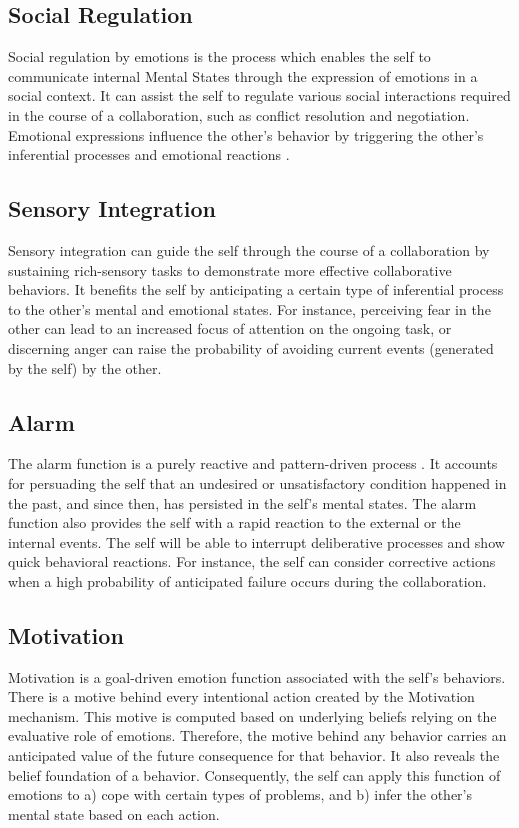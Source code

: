 \documentclass[12pt]{report}
\begin{document}
\subsection{Social Regulation} Social regulation by emotions is the process
which enables the self to communicate internal Mental States through the
expression of emotions in a social context. It can assist the self to regulate
various social interactions required in the course of a collaboration, such as
conflict resolution and negotiation. Emotional expressions influence the other's
behavior by triggering the other's inferential processes and emotional reactions
\cite{kleef:emotion-regulate-social}.

\subsection{Sensory Integration} Sensory integration can guide the self
through the course of a collaboration by sustaining rich-sensory tasks to
demonstrate more effective collaborative behaviors. It benefits the self by
anticipating a certain type of inferential process to the other's mental and
emotional states. For instance, perceiving fear in the other can lead to an
increased focus of attention on the ongoing task, or discerning anger can raise
the probability of avoiding current events (generated by the self) by the other.

\subsection{Alarm} \label{sub:emotion-alarm} The alarm function is a purely
reactive and pattern-driven process \cite{sloman:beyond-shallow}. It accounts
for persuading the self that an undesired or unsatisfactory condition happened
in the past, and since then, has persisted in the self's mental states. The
alarm function also provides the self with a rapid reaction to the external or
the internal events. The self will be able to interrupt deliberative processes
and show quick behavioral reactions. For instance, the self can consider
corrective actions when a high probability of anticipated failure occurs during
the collaboration.

\subsection{Motivation} Motivation is a goal-driven emotion function
associated with the self's behaviors. There is a motive behind every intentional action
created by the Motivation mechanism. This motive is computed based on underlying
beliefs relying on the evaluative role of emotions. Therefore, the motive behind
any behavior carries an anticipated value of the future consequence for that
behavior. It also reveals the belief foundation of a behavior. Consequently, the
self can apply this function of emotions to a) cope with certain types of
problems, and b) infer the other's mental state based on each action.
\end{document}
